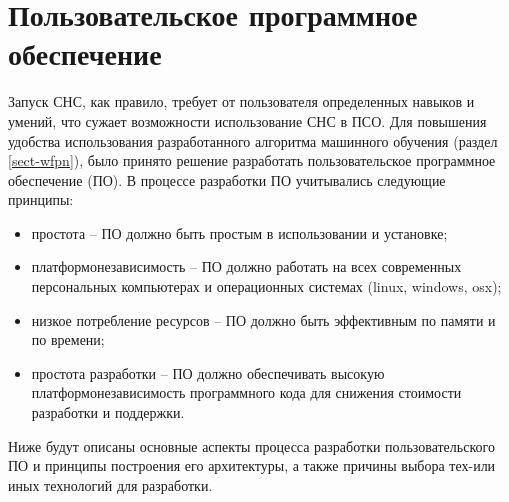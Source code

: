 \section{Пользовательское программное обеспечение}

Запуск СНС, как правило, требует от пользователя определенных навыков и умений, что сужает возможности использование СНС в ПСО. Для повышения удобства использования разработанного алгоритма машинного обучения (раздел \ref{sect-wfpn}), было принято решение разработать пользовательское программное обеспечение (ПО). В процессе разработки ПО учитывались следующие принципы:
\begin{itemize}
    \item простота -- ПО должно быть простым в использовании и установке;
    \item платформонезависимость -- ПО должно работать на всех современных персональных компьютерах и операционных системах (linux, windows, osx);
    \item низкое потребление ресурсов -- ПО должно быть эффективным по памяти и по времени;
    \item простота разработки -- ПО должно обеспечивать высокую платформонезависимость программного кода для снижения стоимости разработки и поддержки.
\end{itemize}

Ниже будут описаны основные аспекты процесса разработки пользовательского ПО и принципы построения его архитектуры, а также причины выбора тех-или иных технологий для разработки.




\clearpage